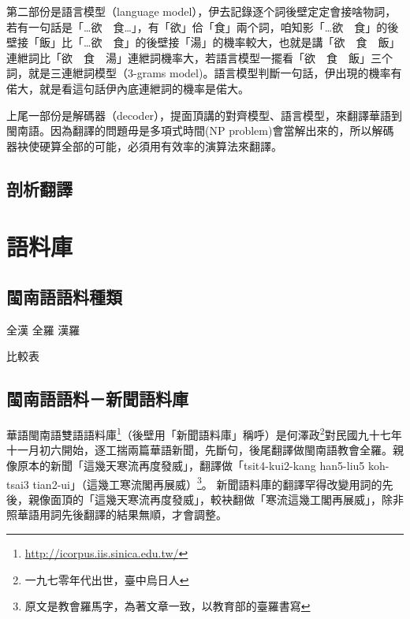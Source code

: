 \documentclass[final,oneside,onecolumn,12pt,a4paper]{book}%
\begin{document}
第二部份是語言模型（language model），伊去記錄逐个詞後壁定定會接啥物詞，若有一句話是「…欲　食…」，有「欲」佮「食」兩个詞，咱知影「…欲　食」的後壁接「飯」比「…欲　食」的後壁接「湯」的機率較大，也就是講「欲　食　飯」連紲詞比「欲　食　湯」連紲詞機率大，若語言模型一擺看「欲　食　飯」三个詞，就是三連紲詞模型（3-grams model)。語言模型判斷一句話，伊出現的機率有偌大，就是看這句話伊內底連紲詞的機率是偌大。

上尾一部份是解碼器（decoder），提面頂講的對齊模型、語言模型，來翻譯華語到閩南語。因為翻譯的問題毋是多項式時間(NP problem)會當解出來的，所以解碼器袂使硬算全部的可能，必須用有效率的演算法來翻譯。

\subsection{剖析翻譯}
\label{小節：剖析翻譯}


\section{語料庫}
\label{節：語料庫}

\subsection{閩南語語料種類}
\label{節：閩南語語料種類}
全漢
全羅
漢羅

比較表

\subsection{閩南語語料－新聞語料庫}
\label{節：新聞語料庫}
華語閩南語雙語語料庫\footnote{\url{http://icorpus.iis.sinica.edu.tw/}}（後壁用「新聞語料庫」稱呼）是何澤政\footnote{一九七零年代出世，臺中烏日人}對民國九十七年十一月初六開始，逐工揣兩篇華語新聞，先斷句，後尾翻譯做閩南語教會全羅。親像原本的新聞「這幾天寒流再度發威」，翻譯做「tsit4-kui2-kang han5-liu5 koh-tsai3 tian2-ui」（這幾工寒流閣再展威）\footnote{原文是教會羅馬字，為著文章一致，以教育部的臺羅書寫}。
新聞語料庫的翻譯罕得改變用詞的先後，親像面頂的「這幾天寒流再度發威」，較袂翻做「寒流這幾工閣再展威」，除非照華語用詞先後翻譯的結果無順，才會調整。
\end{document}

